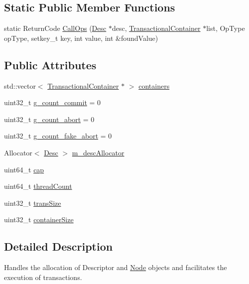 \subsection*{Static Public Member Functions}
\begin{DoxyCompactItemize}
\item 
static Return\+Code \hyperlink{classTransactionHandler_a0155e14e3f8f1a20f5962999c1bf91af}{Call\+Ops} (\hyperlink{structDesc}{Desc} $\ast$desc, \hyperlink{classTransactionalContainer}{Transactional\+Container} $\ast$list, Op\+Type op\+Type, setkey\+\_\+t key, int value, int \&found\+Value)
\end{DoxyCompactItemize}
\subsection*{Public Attributes}
\begin{DoxyCompactItemize}
\item 
std\+::vector$<$ \hyperlink{classTransactionalContainer}{Transactional\+Container} $\ast$ $>$ \hyperlink{classTransactionHandler_a2ff242c44d06eb9fcceac93e703b377b}{containers}
\item 
uint32\+\_\+t \hyperlink{classTransactionHandler_aa0e3e84eac8fe9ee92c41ab61014fd3d}{g\+\_\+count\+\_\+commit} = 0
\item 
uint32\+\_\+t \hyperlink{classTransactionHandler_af87828161891a98e9910c937407876ab}{g\+\_\+count\+\_\+abort} = 0
\item 
uint32\+\_\+t \hyperlink{classTransactionHandler_a543da4f34515c10c92fcccd764dc2440}{g\+\_\+count\+\_\+fake\+\_\+abort} = 0
\item 
Allocator$<$ \hyperlink{structDesc}{Desc} $>$ \hyperlink{classTransactionHandler_a819bfbeebff4d0d591dd71e3890cfb5c}{m\+\_\+desc\+Allocator}
\item 
uint64\+\_\+t \hyperlink{classTransactionHandler_a2cf5ca7f79dbfed3c2a74524c510fce9}{cap}
\item 
uint64\+\_\+t \hyperlink{classTransactionHandler_aa836fefbe472dc6db2915ea723f148ef}{thread\+Count}
\item 
uint32\+\_\+t \hyperlink{classTransactionHandler_a9a2c1b281ece3123c6a18fc85a335ce4}{trans\+Size}
\item 
uint32\+\_\+t \hyperlink{classTransactionHandler_a97ca9af5f1ca5765520a73e5cd2fb554}{container\+Size}
\end{DoxyCompactItemize}


\subsection{Detailed Description}
Handles the allocation of Descriptor and \hyperlink{structNode}{Node} objects and facilitates the execution of transactions. 

